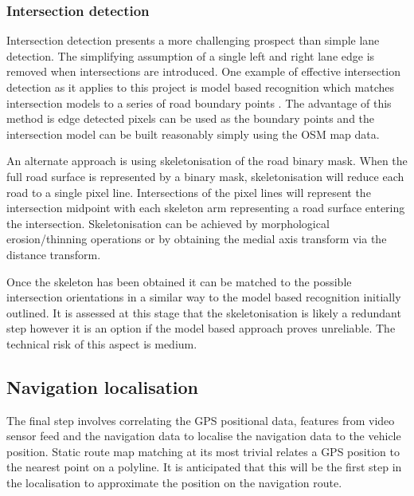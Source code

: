 \documentclass[]{aiaa-tc}%
\begin{document}

\subsubsection{Intersection detection}

Intersection detection presents a more challenging prospect than simple lane detection. The simplifying assumption of a single left and right lane edge is removed when intersections are introduced. One example of effective intersection detection as it applies to this project is model based recognition which matches intersection models to a series of road boundary points \citep{modelBasedIntersection}. The advantage of this method is edge detected pixels can be used as the boundary points and the intersection model can be built reasonably simply using the OSM map data.

An alternate approach is using skeletonisation of the road binary mask. When the full road surface is represented by a binary mask, skeletonisation will reduce each road to a single pixel line. Intersections of the pixel lines will represent the intersection midpoint with each skeleton arm representing a road surface entering the intersection. Skeletonisation can be achieved by morphological erosion/thinning operations or by obtaining the medial axis transform via the distance transform.

Once the skeleton has been obtained it can be matched to the possible intersection orientations in a similar way to the model based recognition initially outlined. It is assessed at this stage that the skeletonisation is likely a redundant step however it is an option if the model based approach proves unreliable. The technical risk of this aspect is medium.

\subsection{Navigation localisation}

The final step involves correlating the GPS positional data, features from video sensor feed and the navigation data to localise the navigation data to the vehicle position. Static route map matching at its most trivial relates a GPS position to the nearest point on a polyline. It is anticipated that this will be the first step in the localisation to approximate the position on the navigation route. 
\end{document}
